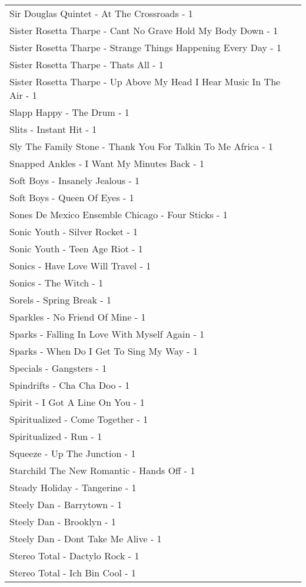 \documentclass[
]{article}
\begin{document}
\begin{longtable}{l}
Sir Douglas Quintet - At The Crossroads - 1 \\ 
Sister Rosetta Tharpe - Cant No Grave Hold My Body Down - 1 \\ 
Sister Rosetta Tharpe - Strange Things Happening Every Day - 1 \\ 
Sister Rosetta Tharpe - Thats All - 1 \\ 
Sister Rosetta Tharpe - Up Above My Head I Hear Music In The Air - 1 \\ 
Slapp Happy - The Drum - 1 \\ 
Slits - Instant Hit - 1 \\ 
Sly The Family Stone - Thank You For Talkin To Me Africa - 1 \\ 
Snapped Ankles - I Want My Minutes Back - 1 \\ 
Soft Boys - Insanely Jealous - 1 \\ 
Soft Boys - Queen Of Eyes - 1 \\ 
Sones De Mexico Ensemble Chicago - Four Sticks - 1 \\ 
Sonic Youth - Silver Rocket - 1 \\ 
Sonic Youth - Teen Age Riot - 1 \\ 
Sonics - Have Love Will Travel - 1 \\ 
Sonics - The Witch - 1 \\ 
Sorels - Spring Break - 1 \\ 
Sparkles - No Friend Of Mine - 1 \\ 
Sparks - Falling In Love With Myself Again - 1 \\ 
Sparks - When Do I Get To Sing My Way - 1 \\ 
Specials - Gangsters - 1 \\ 
Spindrifts - Cha Cha Doo - 1 \\ 
Spirit - I Got A Line On You - 1 \\ 
Spiritualized - Come Together - 1 \\ 
Spiritualized - Run - 1 \\ 
Squeeze - Up The Junction - 1 \\ 
Starchild The New Romantic - Hands Off - 1 \\ 
Steady Holiday - Tangerine - 1 \\ 
Steely Dan - Barrytown - 1 \\ 
Steely Dan - Brooklyn - 1 \\ 
Steely Dan - Dont Take Me Alive - 1 \\ 
Stereo Total - Dactylo Rock - 1 \\ 
Stereo Total - Ich Bin Cool - 1 \\ 

\end{longtable}
\end{document}
